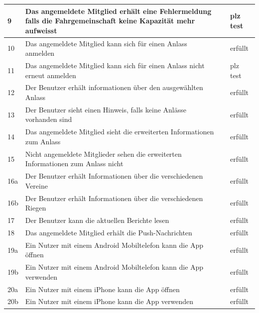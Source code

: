 \begin{longtable}{ l | p{7cm} | l | l }
	9	&	Das angemeldete Mitglied erhält eine Fehlermeldung falls die Fahrgemeinschaft keine Kapazität mehr aufweisst
				&	\nameref{table:req_4} 	&	plz test\\ \hline
	10	&	Das angemeldete Mitglied kann sich für einen Anlass anmelden
				&	\nameref{table:req_5} 	&	erfüllt\\ \hline
	11	&	Das angemeldete Mitglied kann sich für einen Anlass nicht erneut anmelden
				&	\nameref{table:req_5} 	&	plz test\\ \hline
	12	&	Der Benutzer erhält informationen über den ausgewählten Anlass
				&	\nameref{table:req_6} 	&	erfüllt\\ \hline
	13	&	Der Benutzer sieht einen Hinweis, falls keine Anlässe vorhanden sind
				&	\nameref{table:req_6} 	&	erfüllt\\ \hline
	14	&	Das angemeldete Mitglied sieht die erweiterten Informationen zum Anlass
				&	\nameref{table:req_7} 	&	erfüllt\\ \hline
	15	&	Nicht angemeldete Mitglieder sehen die erweiterten Informationen zum Anlass nicht
				&	\nameref{table:req_7} 	&	erfüllt\\ \hline
	16a	&	Der Benutzer erhält Informationen über die verschiedenen Vereine
				&	\nameref{table:req_8} 	&	erfüllt\\ \hline
	16b	&	Der Benutzer erhält Informationen über die verschiedenen Riegen
				&	\nameref{table:req_8} 	&	erfüllt\\ \hline
	17	&	Der Benutzer kann die aktuellen Berichte lesen
				&	\nameref{table:req_9} 	&	erfüllt\\ \hline
	18	&	Das angemeldete Mitglied erhält die Push-Nachrichten
				&	\nameref{table:req_10} 	&	erfüllt\\ \hline
	19a	&	Ein Nutzer mit einem Android Mobiltelefon kann die App öffnen
				&	\nameref{table:req_nf_1} 	&	erfüllt\\ \hline
	19b	&	Ein Nutzer mit einem Android Mobiltelefon kann die App verwenden
				&	\nameref{table:req_nf_1} 	&	erfüllt\\ \hline
	20a	&	Ein Nutzer mit einem iPhone kann die App öffnen
				&	\nameref{table:req_nf_2} 	&	erfüllt\\ \hline
	20b	&	Ein Nutzer mit einem iPhone kann die App verwenden
				&	\nameref{table:req_nf_2} 	&	erfüllt

\end{longtable}

\newpage
